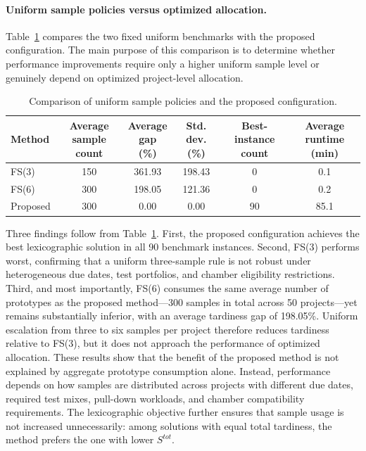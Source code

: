 \documentclass[11pt]{article}
\begin{document}
\paragraph{Uniform sample policies versus optimized allocation.}
Table~\ref{tab:sample_policy_comparison} compares the two fixed uniform benchmarks with the proposed configuration.
The main purpose of this comparison is to determine whether performance improvements require only a higher uniform sample level or genuinely depend on optimized project-level allocation.
\begin{table}[H]
\centering
\caption{Comparison of uniform sample policies and the proposed configuration.}
\label{tab:sample_policy_comparison}
\begin{tabular}{lccccc}
\hline
\textbf{Method}
& \shortstack{\textbf{Average}\\\textbf{sample count}}
& \shortstack{\textbf{Average}\\\textbf{gap (\%)}}
& \shortstack{\textbf{Std.}\\\textbf{dev. (\%)}}
& \shortstack{\textbf{Best-instance}\\\textbf{count}}
& \shortstack{\textbf{Average}\\\textbf{runtime (min)}} \\
\hline
FS(3) & 150 & 361.93 & 198.43 & 0 & 0.1 \\
FS(6) & 300 & 198.05 & 121.36 & 0 & 0.2 \\
Proposed & 300 & 0.00 & 0.00 & 90 & 85.1 \\
\hline
\end{tabular}
\end{table}
Three findings follow from Table~\ref{tab:sample_policy_comparison}.
First, the proposed configuration achieves the best lexicographic solution in all 90 benchmark instances.
Second, FS(3) performs worst, confirming that a uniform three-sample rule is not robust under heterogeneous due dates, test portfolios, and chamber eligibility restrictions.
Third, and most importantly, FS(6) consumes the same average number of prototypes as the proposed method---300 samples in total across 50 projects---yet remains substantially inferior, with an average tardiness gap of 198.05\%.
Uniform escalation from three to six samples per project therefore reduces tardiness relative to FS(3), but it does not approach the performance of optimized allocation.
These results show that the benefit of the proposed method is not explained by aggregate prototype consumption alone.
Instead, performance depends on how samples are distributed across projects with different due dates, required test mixes, pull-down workloads, and chamber compatibility requirements.
The lexicographic objective further ensures that sample usage is not increased unnecessarily: among solutions with equal total tardiness, the method prefers the one with lower \(S^{tot}\).
\end{document}
